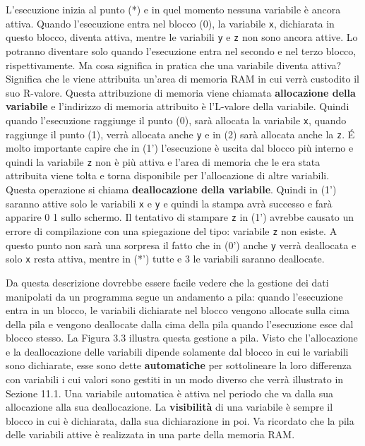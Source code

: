 \documentclass[a4paper,12pt]{book}
\begin{document}
L'esecuzione inizia al punto (*) e in quel momento nessuna variabile è ancora attiva.
Quando l'esecuzione entra nel blocco (0), la variabile \texttt{x}, dichiarata in questo blocco, diventa attiva, mentre le variabili \texttt{y} e \texttt{z} non sono ancora attive.
Lo potranno diventare solo quando l'esecuzione entra nel secondo e nel terzo blocco, rispettivamente.
Ma cosa significa in pratica che una variabile diventa attiva?
Significa che le viene attribuita un'area di memoria RAM in cui verrà custodito il suo R-valore.
Questa attribuzione di memoria viene chiamata \textbf{allocazione della variabile} e l'indirizzo di memoria attribuito è l'L-valore della variabile.
Quindi quando l'esecuzione raggiunge il punto (0), sarà allocata la variabile \texttt{x}, quando raggiunge il punto (1), verrà allocata anche \texttt{y} e in (2) sarà allocata anche la \texttt{z}.
É molto importante capire che in (1') l'esecuzione è uscita dal blocco più interno e quindi la variabile \texttt{z} non è più attiva e l'area di memoria che le era stata attribuita viene tolta e torna disponibile per l'allocazione di altre variabili.
Questa operazione si chiama \textbf{deallocazione della variabile}.
Quindi in (1') saranno attive solo le variabili \texttt{x} e \texttt{y} e quindi la stampa avrà successo e farà apparire 0 1 sullo schermo.
Il tentativo di stampare \texttt{z} in (1') avrebbe causato un errore di compilazione con una spiegazione del tipo: variabile \texttt{z} non esiste.
A questo punto non sarà una sorpresa il fatto che in (0') anche \texttt{y} verrà deallocata e solo \texttt{x} resta attiva, mentre in (*') tutte e 3 le variabili saranno deallocate.

Da questa descrizione dovrebbe essere facile vedere che la gestione dei dati manipolati da un programma segue un andamento a pila: quando l'esecuzione entra in un blocco, le variabili dichiarate nel blocco vengono allocate sulla cima della pila e vengono deallocate dalla cima della pila quando l'esecuzione esce dal blocco stesso.
La Figura 3.3 illustra questa gestione a pila.
Visto che l'allocazione e la deallocazione delle variabili dipende solamente dal blocco in cui le variabili sono dichiarate, esse sono dette \textbf{automatiche} per sottolineare la loro differenza con variabili i cui valori sono gestiti in un modo diverso che verrà illustrato in Sezione 11.1.
Una variabile automatica è attiva nel periodo che va dalla sua allocazione alla sua deallocazione.
La \textbf{visibilità} di una variabile è sempre il blocco in cui è dichiarata, dalla sua dichiarazione in poi.
Va ricordato che la pila delle variabili attive è realizzata in una parte della memoria RAM. 
\end{document}

